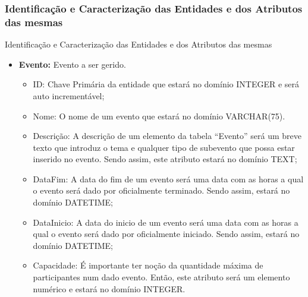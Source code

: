 \documentclass[compress,svgnames,handout,13.7pt]{beamer}
\begin{document}
\subsubsection{Identificação e Caracterização das Entidades e dos Atributos das mesmas}
\begin{frame}{Identificação e Caracterização das Entidades e dos Atributos das mesmas}
\begin{itemize}
                 \item{\textbf{Evento:}} Evento a ser gerido. 
                     \begin{itemize}
                     \item{ID:} Chave Primária da entidade que estará no domínio INTEGER
                       e será auto incrementável;
                     \item{Nome:} O nome de um evento que estará no domínio VARCHAR(75).
                     \item{Descrição:} A descrição de um elemento da tabela ``Evento'' será
                       um breve texto que introduz o tema e qualquer tipo de subevento que possa
                       estar inserido no evento. Sendo assim, este atributo estará no domínio TEXT;
                     \item{DataFim:} A data do fim de um evento será uma data com as horas a qual
                       o evento será dado por oficialmente terminado. Sendo assim, estará no domínio
                       DATETIME;
                     \item{DataInicio:} A data do inicio de um evento será uma data com as horas a qual
                       o evento será dado por oficialmente iniciado. Sendo assim, estará no domínio
                       DATETIME;
                     \item{Capacidade:} É importante ter noção da quantidade máxima de participantes num
                       dado evento. Então, este atributo será um elemento numérico e estará no domínio INTEGER.
                     \end{itemize}
\end{itemize}
\end{frame}
\end{document}
